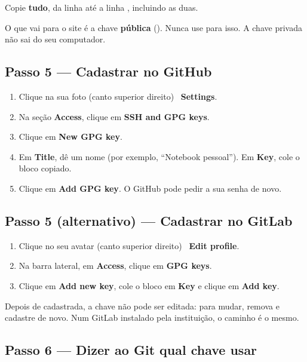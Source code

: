Copie \textbf{tudo}, da linha  até a linha , incluindo as duas.

\begin{atencao}
O que vai para o site é a chave \textbf{pública} (). Nunca use  para isso. A chave privada não sai do seu computador.
\end{atencao}

\subsection{Passo 5 — Cadastrar no GitHub}

\begin{enumerate}
  \item Clique na sua foto (canto superior direito) \faChevronRight\ \textbf{Settings}.
  \item Na seção \textbf{Access}, clique em \textbf{SSH and GPG keys}.
  \item Clique em \textbf{New GPG key}.
  \item Em \textbf{Title}, dê um nome (por exemplo, \enquote{Notebook pessoal}). Em \textbf{Key}, cole o bloco copiado.
  \item Clique em \textbf{Add GPG key}. O GitHub pode pedir a sua senha de novo.
\end{enumerate}

\subsection{Passo 5 (alternativo) — Cadastrar no GitLab}

\begin{enumerate}
  \item Clique no seu avatar (canto superior direito) \faChevronRight\ \textbf{Edit profile}.
  \item Na barra lateral, em \textbf{Access}, clique em \textbf{GPG keys}.
  \item Clique em \textbf{Add new key}, cole o bloco em \textbf{Key} e clique em \textbf{Add key}.
\end{enumerate}

Depois de cadastrada, a chave não pode ser editada: para mudar, remova e cadastre de novo. Num GitLab instalado pela instituição, o caminho é o mesmo.

\subsection{Passo 6 — Dizer ao Git qual chave usar}

